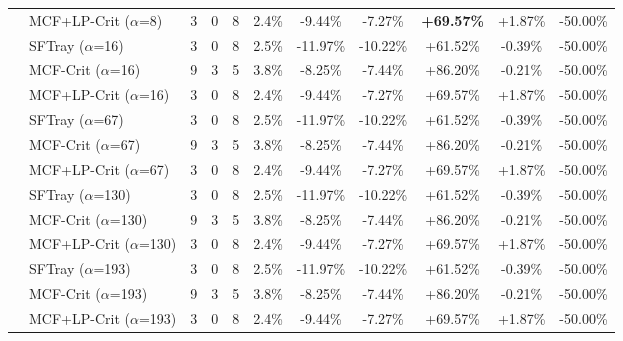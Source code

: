 \begin{table}[t]
{\begin{tabular}{ll|cccc|ccc|cc}
 & MCF+LP-Crit ($\alpha$=8) & 3 & 0 & 8 & 2.4\% & -9.44\% & -7.27\% & \textbf{+69.57\%} & +1.87\% & -50.00\% \\

\addlinespace[0.5em]

 & SFTray ($\alpha$=16) & 3 & 0 & 8 & 2.5\% & -11.97\% & -10.22\% & +61.52\% & -0.39\% & -50.00\% \\

 & MCF-Crit ($\alpha$=16) & 9 & 3 & 5 & 3.8\% & -8.25\% & -7.44\% & +86.20\% & -0.21\% & -50.00\% \\

 & MCF+LP-Crit ($\alpha$=16) & 3 & 0 & 8 & 2.4\% & -9.44\% & -7.27\% & +69.57\% & +1.87\% & -50.00\% \\

\addlinespace[0.5em]

 & SFTray ($\alpha$=67) & 3 & 0 & 8 & 2.5\% & -11.97\% & -10.22\% & +61.52\% & -0.39\% & -50.00\% \\

 & MCF-Crit ($\alpha$=67) & 9 & 3 & 5 & 3.8\% & -8.25\% & -7.44\% & +86.20\% & -0.21\% & -50.00\% \\

 & MCF+LP-Crit ($\alpha$=67) & 3 & 0 & 8 & 2.4\% & -9.44\% & -7.27\% & +69.57\% & +1.87\% & -50.00\% \\

\addlinespace[0.5em]

 & SFTray ($\alpha$=130) & 3 & 0 & 8 & 2.5\% & -11.97\% & -10.22\% & +61.52\% & -0.39\% & -50.00\% \\

 & MCF-Crit ($\alpha$=130) & 9 & 3 & 5 & 3.8\% & -8.25\% & -7.44\% & +86.20\% & -0.21\% & -50.00\% \\

 & MCF+LP-Crit ($\alpha$=130) & 3 & 0 & 8 & 2.4\% & -9.44\% & -7.27\% & +69.57\% & +1.87\% & -50.00\% \\

\addlinespace[0.5em]

 & SFTray ($\alpha$=193) & 3 & 0 & 8 & 2.5\% & -11.97\% & -10.22\% & +61.52\% & -0.39\% & -50.00\% \\

 & MCF-Crit ($\alpha$=193) & 9 & 3 & 5 & 3.8\% & -8.25\% & -7.44\% & +86.20\% & -0.21\% & -50.00\% \\

 & MCF+LP-Crit ($\alpha$=193) & 3 & 0 & 8 & 2.4\% & -9.44\% & -7.27\% & +69.57\% & +1.87\% & -50.00\% \\


\end{tabular}}
\end{table}
